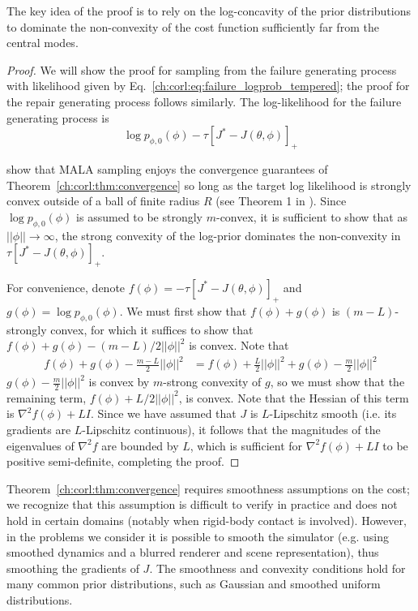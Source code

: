 The key idea of the proof is to rely on the log-concavity of the prior distributions to dominate the non-convexity of the cost function sufficiently far from the central modes.

\begin{proof}
    We will show the proof for sampling from the failure generating process with likelihood given by Eq.~\eqref{ch:corl:eq:failure_logprob_tempered}; the proof for the repair generating process follows similarly. The log-likelihood for the failure generating process is
    \begin{equation}
        \log p_{\phi, 0}(\phi) - \tau [J^* - J(\theta, \phi)]_+ \label{ch:corl:eq:failure_logprob}
    \end{equation}

    \cite{maSamplingCanBe2019} show that MALA sampling enjoys the convergence guarantees of Theorem~\ref{ch:corl:thm:convergence} so long as the target log likelihood is strongly convex outside of a ball of finite radius $R$ (see Theorem 1 in \cite{maSamplingCanBe2019}). Since $\log p_{\phi, 0}(\phi)$ is assumed to be strongly $m$-convex, it is sufficient to show that as $||\phi|| \to \infty$, the strong convexity of the log-prior dominates the non-convexity in $\tau [J^* - J(\theta, \phi)]_+$.

    For convenience, denote $f(\phi) = -\tau [J^* - J(\theta, \phi)]_+$ and $g(\phi) = \log p_{\phi, 0}(\phi)$. We must first show that $f(\phi) + g(\phi)$ is $(m-L)$-strongly convex, for which it suffices to show that $f(\phi) + g(\phi) - (m-L)/2 ||\phi||^2$ is convex. Note that
    \begin{align}
        f(\phi) + g(\phi) - \frac{m-L}{2} ||\phi||^2 & = f(\phi) + \frac{L}{2} ||\phi||^2 + g(\phi) - \frac{m}{2} ||\phi||^2
    \end{align}
    $g(\phi) - \frac{m}{2} ||\phi||^2$ is convex by $m$-strong convexity of $g$, so we must show that the remaining term, $f(\phi) + L/2 ||\phi||^2$, is convex. Note that the Hessian of this term is $\nabla^2 f(\phi) + LI$. Since we have assumed that $J$ is $L$-Lipschitz smooth (i.e. its gradients are $L$-Lipschitz continuous), it follows that the magnitudes of the eigenvalues of $\nabla^2 f$ are bounded by $L$, which is sufficient for $\nabla^2 f(\phi) + LI$ to be positive semi-definite, completing the proof.
\end{proof}

Theorem~\ref{ch:corl:thm:convergence} requires smoothness assumptions on the cost; we recognize that this assumption is difficult to verify in practice and does not hold in certain domains (notably when rigid-body contact is involved). However, in the problems we consider it is possible to smooth the simulator (e.g. using smoothed dynamics and a blurred renderer and scene representation), thus smoothing the gradients of $J$. The smoothness and convexity conditions hold for many common prior distributions, such as Gaussian and smoothed uniform distributions.

